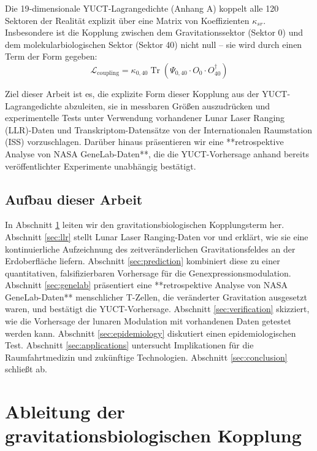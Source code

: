 \documentclass[12pt,a4paper]{article}
\theoremstyle{remark}
\begin{document}
	Die 19‑dimensionale YUCT-Lagrangedichte (Anhang A) koppelt alle 120 Sektoren der Realität explizit über eine Matrix von Koeffizienten \(\kappa_{sr}\). Insbesondere ist die Kopplung zwischen dem Gravitationssektor (Sektor 0) und dem molekularbiologischen Sektor (Sektor 40) nicht null – sie wird durch einen Term der Form gegeben:
	\begin{equation}
		\mathcal{L}_{\text{coupling}} = \kappa_{0,40} \operatorname{Tr}(\Psi_{0,40} \cdot O_0 \cdot O_{40}^\dagger)
		\label{eq:coupling-general}
	\end{equation}
	
	Ziel dieser Arbeit ist es, die explizite Form dieser Kopplung aus der YUCT-Lagrangedichte abzuleiten, sie in messbaren Größen auszudrücken und experimentelle Tests unter Verwendung vorhandener Lunar Laser Ranging (LLR)-Daten und Transkriptom-Datensätze von der Internationalen Raumstation (ISS) vorzuschlagen. Darüber hinaus präsentieren wir eine **retrospektive Analyse von NASA GeneLab-Daten**, die die YUCT-Vorhersage anhand bereits veröffentlichter Experimente unabhängig bestätigt.
	
	\subsection{Aufbau dieser Arbeit}
	
	In Abschnitt \ref{sec:derivation} leiten wir den gravitationsbiologischen Kopplungsterm her. Abschnitt \ref{sec:llr} stellt Lunar Laser Ranging-Daten vor und erklärt, wie sie eine kontinuierliche Aufzeichnung des zeitveränderlichen Gravitationsfeldes an der Erdoberfläche liefern. Abschnitt \ref{sec:prediction} kombiniert diese zu einer quantitativen, falsifizierbaren Vorhersage für die Genexpressionsmodulation. Abschnitt \ref{sec:genelab} präsentiert eine **retrospektive Analyse von NASA GeneLab-Daten** menschlicher T-Zellen, die veränderter Gravitation ausgesetzt waren, und bestätigt die YUCT-Vorhersage. Abschnitt \ref{sec:verification} skizziert, wie die Vorhersage der lunaren Modulation mit vorhandenen Daten getestet werden kann. Abschnitt \ref{sec:epidemiology} diskutiert einen epidemiologischen Test. Abschnitt \ref{sec:applications} untersucht Implikationen für die Raumfahrtmedizin und zukünftige Technologien. Abschnitt \ref{sec:conclusion} schließt ab.
	
	\section{Ableitung der gravitationsbiologischen Kopplung}
	\label{sec:derivation}
	
\end{document}
